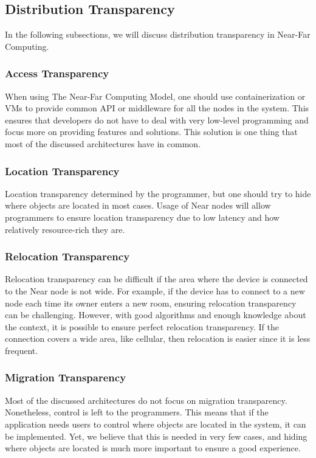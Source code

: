 \subsection{Distribution Transparency}
In the following subsections, we will discuss distribution transparency in Near-Far Computing.

\subsubsection{Access Transparency}
When using The Near-Far Computing Model, one should use containerization or VMs to provide common API or middleware for all the nodes in the system. This ensures that developers do not have to deal with very low-level programming and focus more on providing features and solutions. This solution is one thing that most of the discussed architectures have in common.

\subsubsection{Location Transparency}
Location transparency determined by the programmer, but one should try to hide where objects are located in most cases. Usage of Near nodes will allow programmers to ensure location transparency due to low latency and how relatively resource-rich they are.

\subsubsection{Relocation Transparency}
Relocation transparency can be difficult if the area where the device is connected to the Near node is not wide. For example, if the device has to connect to a new node each time its owner enters a new room, ensuring relocation transparency can be challenging. However, with good algorithms and enough knowledge about the context, it is possible to ensure perfect relocation transparency. If the connection covers a wide area, like cellular, then relocation is easier since it is less frequent.

\subsubsection{Migration Transparency}
Most of the discussed architectures do not focus on migration transparency. Nonetheless, control is left to the programmers. This means that if the application needs users to control where objects are located in the system, it can be implemented. Yet, we believe that this is needed in very few cases, and hiding where objects are located is much more important to ensure a good experience.

